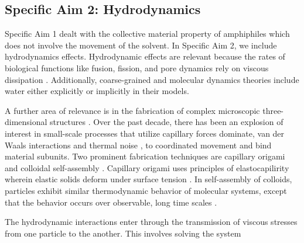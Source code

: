 \subsection{Specific Aim 2: Hydrodynamics}
\label{subsec:specific_aim_2}
Specific Aim 1 dealt with the collective material property of amphiphiles which does not involve the movement  of the solvent.
In Specific Aim 2, we include hydrodynamics effects. Hydrodynamic effects are relevant
because the rates of biological functions like fusion, fission, and pore dynamics rely on viscous dissipation \cite{RYHAM20112929}. 
Additionally, coarse-grained and molecular dynamics theories include water either explicitly or implicitly in their models. 

A further area of relevance is in the fabrication of complex microscopic three-dimensional structures \cite{Cho2010}.
Over the past decade, there has been an explosion of interest in small-scale processes that utilize capillary forces dominate,  van der Waals interactions and thermal noise  \cite{Zhang2017},
to coordinated movement and bind  material subunits. Two prominent fabrication techniques are capillary origami 
\cite{Pandey2011,Leong2007,Reynolds2019} and colloidal self-assembly \cite{Dasgupta2017,Siontorou2017}. Capillary origami uses principles of elastocapilirity wherein elastic solids deform under surface tension \cite{Bico2018,VanHonschoten2010}. In self-assembly of colloids, 
particles exhibit similar thermodynamic behavior of molecular systems, except that the behavior occurs over observable, long time scales \cite{Zhang2017}. 

The hydrodynamic interactions enter through the transmission of viscous stresses from one particle to the another.
This involves solving the system 

\setcounter{midequation}{\theequation}
\addtocounter{midequation}{2}

